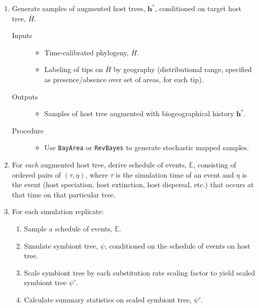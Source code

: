 \documentclass[11pt]{article}
\newcommand{\targetHostTree}{\bar{H}}
\newcommand{\augmentedHostTreeSamples}{\mathbf{h}^{*}}
\newcommand{\simulationTime}{\tau}
\newcommand{\hostEvent}{\eta}
\newcommand{\hostEventSchedule}{\mathbb{E}}
\newcommand{\symbiontTree}{\psi}
\newcommand{\scaledSymbiontTree}{\psi\prime}
\begin{document}
\begin{enumerate}
    \item Generate samples of augmented host trees, $\augmentedHostTreeSamples$, conditioned on target host tree, $\targetHostTree$.
    \begin{description}
        \item[Inputs]
            \begin{itemize}
                \item Time-calibrated phylogeny, $\targetHostTree$.
                \item Labeling of tips on $\targetHostTree$ by geography (distributional range, specified as presence/absence over set of areas, for each tip).
            \end{itemize}
        \item[Outputs]
            \begin{itemize}
                \item Samples of host tree augmented with biogeographical history $\augmentedHostTreeSamples$.
            \end{itemize}
        \item[Procedure]
            \begin{itemize}
                \item Use \texttt{BayArea} or \texttt{RevBayes} to generate stochastic mapped samples.
            \end{itemize}
    \end{description}

\item For \textit{each} augmented host tree, derive schedule of events, $\hostEventSchedule$, consisting of ordered pairs of $(\simulationTime, \hostEvent)$, where $\simulationTime$ is the simulation time of an event and $\hostEvent$ is the event (host speciation, host extinction, host dispersal, etc.) that occurs at that time on that particular tree.

    \item For each simulation replicate:
    \begin{enumerate}
        \item Sample a schedule of events, $\hostEventSchedule$.
        \item Simulate symbiont tree, $\symbiontTree$, conditioned on the schedule of events on host tree.
        \item Scale symbiont tree by each substitution rate scaling factor to yield scaled symbiont tree $\scaledSymbiontTree$.
        \item Calculate summary statistics on scaled symbiont tree, $\scaledSymbiontTree$.
    \end{enumerate}

\end{enumerate}
\end{document}
